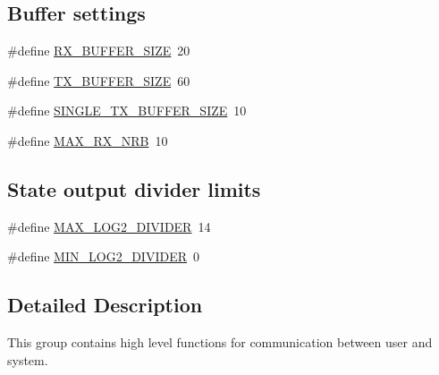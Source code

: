 \subsection*{\-Buffer settings}
\begin{DoxyCompactItemize}
\item 
\#define \hyperlink{group__user__interface_ga739a2a1a0047c98ac1b18ecd25dac092}{\-R\-X\-\_\-\-B\-U\-F\-F\-E\-R\-\_\-\-S\-I\-Z\-E}~20
\item 
\#define \hyperlink{group__user__interface_ga9ab33647617098646990fe263600b650}{\-T\-X\-\_\-\-B\-U\-F\-F\-E\-R\-\_\-\-S\-I\-Z\-E}~60
\item 
\#define \hyperlink{group__user__interface_ga0846b13f494cb412b27a5d30d2e227e6}{\-S\-I\-N\-G\-L\-E\-\_\-\-T\-X\-\_\-\-B\-U\-F\-F\-E\-R\-\_\-\-S\-I\-Z\-E}~10
\item 
\#define \hyperlink{group__user__interface_ga36568984b1040a53e0d7d64d67066de4}{\-M\-A\-X\-\_\-\-R\-X\-\_\-\-N\-R\-B}~10
\end{DoxyCompactItemize}
\subsection*{\-State output divider limits}
\begin{DoxyCompactItemize}
\item 
\#define \hyperlink{group__user__interface_ga9f7db6d016bae1297a6e75263dd6d186}{\-M\-A\-X\-\_\-\-L\-O\-G2\-\_\-\-D\-I\-V\-I\-D\-E\-R}~14
\item 
\#define \hyperlink{group__user__interface_gabef3d4b97cf2ed7d11401dafdd3fb6ea}{\-M\-I\-N\-\_\-\-L\-O\-G2\-\_\-\-D\-I\-V\-I\-D\-E\-R}~0
\end{DoxyCompactItemize}


\subsection{\-Detailed \-Description}
\-This group contains high level functions for communication between user and system. 

